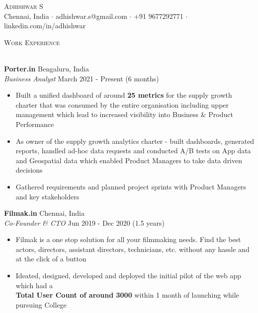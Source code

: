 \documentclass[a4paper]{article}
\newcommand{\lineunder} {
    \vspace*{-8pt} \\
    \hspace*{-18pt} \hrulefill \\
}
\newcommand{\header} [1] {
    {\hspace*{-18pt}\vspace*{6pt} \textsc{#1}}
    \vspace*{-6pt} \lineunder
}
\begin{document}
\vspace*{-40pt}

    

\vspace*{-10pt}
\begin{center}
    {\Huge \scshape {Adhishwar S}}\\
    Chennai, India $\cdot$ adhishwar.s@gmail.com $\cdot$ +91 9677292771 $\cdot$ linkedin.com/in/adhishwar\\
\end{center}

\header{Work Experience}
\vspace{1mm}


\textbf{Porter.in} \hfill Bengaluru, India\\
\textit{Business Analyst} \hfill March 2021 - Present (6 months)\\
\vspace{-1mm}
\begin{itemize} \itemsep 1pt
    \item Built a unified dashboard of around \textbf{25 metrics} for the supply growth charter that was consumed by the entire organisation including upper management which lead to increased visibility into Business \& Product Performance
    \item As owner of the supply growth analytics charter - built dashboards, generated reports, handled ad-hoc data requests and conducted A/B tests on App data and Geospatial data which enabled Product Managers to take data driven decisions
    \item Gathered requirements and planned project sprints with Product Managers and key stakeholders
\end{itemize}
\textbf{Filmak.in} \hfill Chennai, India\\
\textit{Co-Founder \& CTO} \hfill Jun 2019 - Dec 2020 (1.5 years)\\
\vspace{-1mm}
\begin{itemize} \itemsep 1pt
    \item Filmak is a one stop solution for all your filmmaking needs. Find the best actors, directors, assistant directors, technicians, etc. without any hassle and at the click of a button
    \item Ideated, designed, developed and deployed the initial pilot of the web app which had a\\ \textbf{Total User Count of around 3000} within 1 month of launching while pursuing College
\end{itemize}
\end{document}

